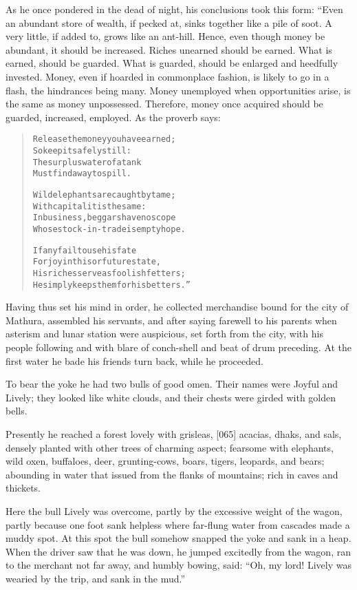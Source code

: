 \documentclass[article, twoside, 14pt]{memoir}
\renewenvironment{verbatim}{%
\begin{quote}%
\vskip -10pt%
\begin{alltt}\normalfont\large}{\end{alltt}%
\end{quote}%
\vskip -10pt
} %
\begin{document}
As he once pondered in the dead of night, his conclusions took this
form: “Even an abundant store of wealth, if pecked at, sinks
together like a pile of soot. A very little, if added to, grows
like an ant-hill. Hence, even though money be abundant, it should
be increased. Riches unearned should be earned. What is earned,
should be guarded. What is guarded, should be enlarged and
heedfully invested. Money, even if hoarded in commonplace fashion,
is likely to go in a flash, the hindrances being many. Money
unemployed when opportunities arise, is the same as money
unpossessed. Therefore, money once acquired should be guarded,
increased, employed. As the proverb says:

\begin{verbatim}
Release the money you have earned;
    So keep it safely still:
The surplus water of a tank
    Must find a way to spill.

Wild elephants are caught by tame;
With capital it is the same:
In business, beggars have no scope
Whose stock-in-trade is empty hope.

If any fail to use his fate
For joy in this or future state,
His riches serve as foolish fetters;
He simply keeps them for his betters.”
\end{verbatim}
Having thus set his mind in order, he collected merchandise bound
for the city of Mathura, assembled his servants, and after saying
farewell to his parents when asterism and lunar station were
auspicious, set forth from the city, with his people following and
with blare of conch-shell and beat of drum preceding. At the first
water he bade his friends turn back, while he proceeded.

To bear the yoke he had two bulls of good omen. Their names were
Joyful and Lively; they looked like white clouds, and their chests
were girded with golden bells.

Presently he reached a forest lovely with grisleas, [065] acacias,
dhaks, and sals, densely planted with other trees of charming
aspect; fearsome with elephants, wild oxen, buffaloes, deer,
grunting-cows, boars, tigers, leopards, and bears; abounding in
water that issued from the flanks of mountains; rich in caves and
thickets.

Here the bull Lively was overcome, partly by the excessive weight
of the wagon, partly because one foot sank helpless where far-flung
water from cascades made a muddy spot. At this spot the bull
somehow snapped the yoke and sank in a heap. When the driver saw
that he was down, he jumped excitedly from the wagon, ran to the
merchant not far away, and humbly bowing, said:
``Oh, my lord! Lively was wearied by the trip, and sank in the mud.''
\end{document}
